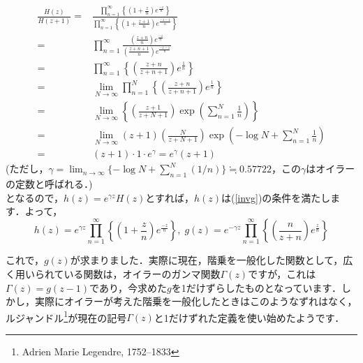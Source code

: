 \documentclass[./main]{subfile}
\begin{document}
\begin{align*}
\frac{H(z)}{H(z+1)}=&\frac{\prod_{n=1}^{\infty}\left\{\left(1+\frac{z}{n}\right)e^{\frac{-z}{n}}\right\}}{\prod_{n=1}^{\infty}\left\{\left(1+\frac{z+1}{n}\right)e^{\frac{-z-1}{n}}\right\}}\\
=&\prod_{n=1}^{\infty}\frac{\left(\frac{z+n}{n}\right)e^{\frac{-z}{n}}}{\left(\frac{z+n+1}{n}\right)e^{\frac{-z-1}{n}}}\\
=&\prod_{n=1}^{\infty}\left\{\left(\frac{z+n}{z+n+1}\right)e^{\frac{1}{n}}\right\}\\
=&\lim_{N\to\infty}\prod_{n=1}^{N}\left\{\left(\frac{z+n}{z+n+1}\right)e^{\frac{1}{n}}\right\}\\
=&\lim_{N\to\infty}\left\{\left(\frac{z+1}{z+N+1}\right)\exp\left(\sum_{n=1}^N{\frac{1}{n}}\right)\right\}\\
=&\lim_{N\to\infty}(z+1)\left(\frac{N}{z+N+1}\right)\exp\left(-\log N+\sum_{n=1}^N\frac{1}{n}\right)\\
=&(z+1)\cdot 1\cdot e^{\gamma}=e^{\gamma}(z+1)
\end{align*}
(ただし，$\gamma=\lim_{n\to\infty}\{-\log N+\sum_{n=1}^N(1/n)\}\fallingdotseq 0.57722$，この$\gamma$はオイラーの定数と呼ばれる．)\\
となるので，$h(z)=e^{\gamma z}H(z)$とすれば，$h(z)$は(\ref{invg})の条件を満たします．よって，
\[
h(z)=e^{\gamma z}\prod_{n=1}^{\infty}\left\{\left(1+\frac{z}{n}\right)e^{\frac{-z}{n}}\right\},\;g(z)=e^{-\gamma z}\prod_{n=1}^{\infty}\left\{\left(\frac{n}{z+n}\right)e^{\frac{z}{n}}\right\}
\]

これで，$g(z)$が求まりました．実際に現在，階乗を一般化した関数として，広く用いられている関数は，オイラーのガンマ関数$\Gamma(z)$ですが，これは$\Gamma(z)=g(z-1)$であり，今求めた$g$を1だけずらしたものとなっています．しかし，実際にオイラーが考えた階乗を一般化したときはこのようなずれはなく，ルジャンドル\footnote{Adrien Marie Legendre, 1752--1833}が現在の記号$\Gamma(z)$と1だけずれた定義を使い始めたようです．
\end{document}
